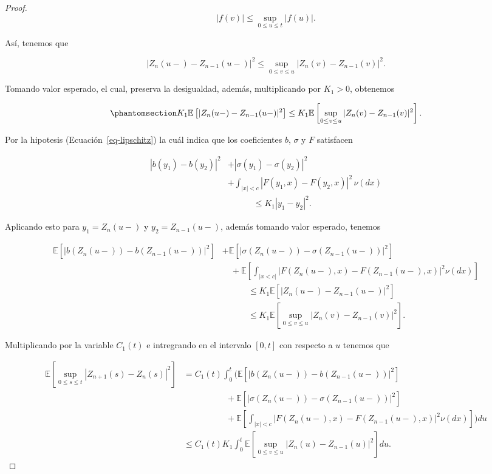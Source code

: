 \documentclass[
  spanish,
  us-letterpaper,
]{scrreprt}
\theoremstyle{plain}
\theoremstyle{plain}
\theoremstyle{plain}
\theoremstyle{definition}
\theoremstyle{remark}
\begin{document}
\begin{proof}
\[
    |f(v)|\leq \sup\limits_{0\leq u\leq t}|f(u)|.
\]

Así, tenemos que

\[
    |Z_n(u-)-Z_{n-1}(u-)|^2\leq \sup\limits_{0\leq v\leq u}|Z_n(v)-Z_{n-1}(v)|^2.
\]

Tomando valor esperado, el cual, preserva la desigualdad, además,
multiplicando por \(K_1>0\), obtenemos

\begin{equation}\phantomsection\label{eq-12}{
    K_1\mathbb{E}\left[|Z_n(u-)-Z_{n-1}(u-)|^2\right] \leq K_1\mathbb{E}\left[\sup\limits_{0\leq v\leq u}|Z_n(v)-Z_{n-1}(v)|^2\right].
}\end{equation}

Por la hipotesis (Ecuación~\ref{eq-lipschitz}) la cuál indica que los
coeficientes \(b\), \(\sigma\) y \(F\) satisfacen

\[
    \begin{aligned}
    |b(y_1) - b(y_2)|^2 & + |\sigma(y_1) - \sigma(y_2)|^2\\ 
    & + \int_{|x| < c} |F(y_1, x) - F(y_2, x)|^2 \, \nu(dx) \\
    &\qquad \quad \leq K_1 |y_1 - y_2|^2.
    \end{aligned}
\]

Aplicando esto para \(y_1=Z_n(u-)\) y \(y_2=Z_{n-1}(u-)\), además
tomando valor esperado, tenemos

\[
    \begin{aligned}
        \mathbb{E}\left[|b(Z_n(u-))-b(Z_{n-1}(u-))|^2\right] & + \mathbb{E}\left[|\sigma(Z_n(u-))-\sigma(Z_{n-1}(u-))|^2\right]\\ 
        & \quad + \mathbb{E}\left[\int_{|x<c|}|F(Z_n(u-),x)-F(Z_{n-1}(u-),x)|^2\nu(dx)\right]\\ 
        & \qquad\quad \leq K_1 \mathbb{E}\left[|Z_n(u-)-Z_{n-1}(u-)|^2\right]\\ 
        & \qquad\quad \leq K_1\mathbb{E}\left[\sup\limits_{0\leq v\leq u}|Z_n(v)-Z_{n-1}(v)|^2\right].
    \end{aligned}
\]

Multiplicando por la variable \(C_1(t)\) e intregrando en el intervalo
\([0,t]\) con respecto a \(u\) tenemos que

\[
    \begin{aligned}
        \mathbb{E}\left[\sup\limits_{0\leq s\leq t}|Z_{n+1}(s)-Z_n(s)|^2\right] & = C_1(t)\int_0^t \Bigg(\mathbb{E}\left[|b(Z_n(u-))-b(Z_{n-1}(u-))|^2\right]\\ 
        & \qquad\qquad\quad + \mathbb{E}\left[|\sigma(Z_n(u-))-\sigma(Z_{n-1}(u-))|^2\right]\\ 
        & \qquad\qquad\quad + \mathbb{E}\left[\int_{|x|<c}|F(Z_n(u-),x)-F(Z_{n-1}(u-),x)|^2\nu(dx)\right]\Bigg)du\\ 
        & \leq C_1(t) K_1\int_0^t \mathbb{E}\left[\sup\limits_{0\leq v\leq u}|Z_n(u)-Z_{n-1}(u)|^2\right]du.
    \end{aligned}
\]


\end{proof}
\end{document}
